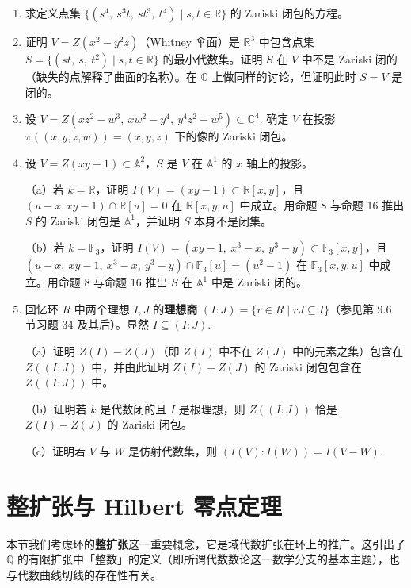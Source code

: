 \begin{enumerate}
\item 求定义点集 \(\{(s^4,\ s^3t,\ st^3,\ t^4) \mid s, t \in \mathbb{R}\}\) 的 Zariski 闭包的方程。

\item 证明 \(V = Z(x^2-y^2z)\)（Whitney 伞面）是 \(\mathbb{R}^3\) 中包含点集 \(S = \{(st,\ s,\ t^2) \mid s, t \in \mathbb{R}\}\) 的最小代数集。证明 \(S\) 在 \(V\) 中不是 Zariski 闭的（缺失的点解释了曲面的名称）。在 \(\mathbb{C}\) 上做同样的讨论，但证明此时 \(S = V\) 是闭的。

\item 设 \(V = Z(xz^2-w^3,\ xw^2-y^4,\ y^4z^2-w^5) \subset \mathbb{C}^4\). 确定 \(V\) 在投影 \(\pi((x,y,z,w)) = (x,y,z)\) 下的像的 Zariski 闭包。

\item 设 \(V = Z(xy-1) \subset \mathbb{A}^2\)，\(S\) 是 \(V\) 在 \(\mathbb{A}^1\) 的 \(x\) 轴上的投影。

（a）若 \(k = \mathbb{R}\)，证明 \(I(V) = (xy-1) \subset \mathbb{R}[x,y]\)，且 \((u-x, xy-1) \cap \mathbb{R}[u] = 0\) 在 \(\mathbb{R}[x,y,u]\) 中成立。用命题 8 与命题 16 推出 \(S\) 的 Zariski 闭包是 \(\mathbb{A}^1\)，并证明 \(S\) 本身不是闭集。

（b）若 \(k = \mathbb{F}_3\)，证明 \(I(V) = (xy-1,\ x^3-x,\ y^3-y) \subset \mathbb{F}_3[x,y]\)，且 \((u-x,\ xy-1,\ x^3-x,\ y^3-y) \cap \mathbb{F}_3[u] = (u^2-1)\) 在 \(\mathbb{F}_3[x,y,u]\) 中成立。用命题 8 与命题 16 推出 \(S\) 在 \(\mathbb{A}^1\) 中是 Zariski 闭的。

\item 回忆环 \(R\) 中两个理想 \(I, J\) 的\textbf{理想商} \((I:J) = \{r \in R \mid rJ \subseteq I\}\)（参见第 9.6 节习题 34 及其后）。显然 \(I \subseteq (I:J)\).

（a）证明 \(Z(I)-Z(J)\)（即 \(Z(I)\) 中不在 \(Z(J)\) 中的元素之集）包含在 \(Z((I:J))\) 中，并由此证明 \(Z(I)-Z(J)\) 的 Zariski 闭包包含在 \(Z((I:J))\) 中。

（b）证明若 \(k\) 是代数闭的且 \(I\) 是根理想，则 \(Z((I:J))\) 恰是 \(Z(I)-Z(J)\) 的 Zariski 闭包。

（c）证明若 \(V\) 与 \(W\) 是仿射代数集，则 \((I(V):I(W)) = I(V-W)\).
\end{enumerate}

\section{整扩张与 Hilbert 零点定理}

本节我们考虑环的\textbf{整扩张}这一重要概念，它是域代数扩张在环上的推广。这引出了 \(\mathbb{Q}\) 的有限扩张中「整数」的定义（即所谓代数数论这一数学分支的基本主题），也与代数曲线切线的存在性有关。

